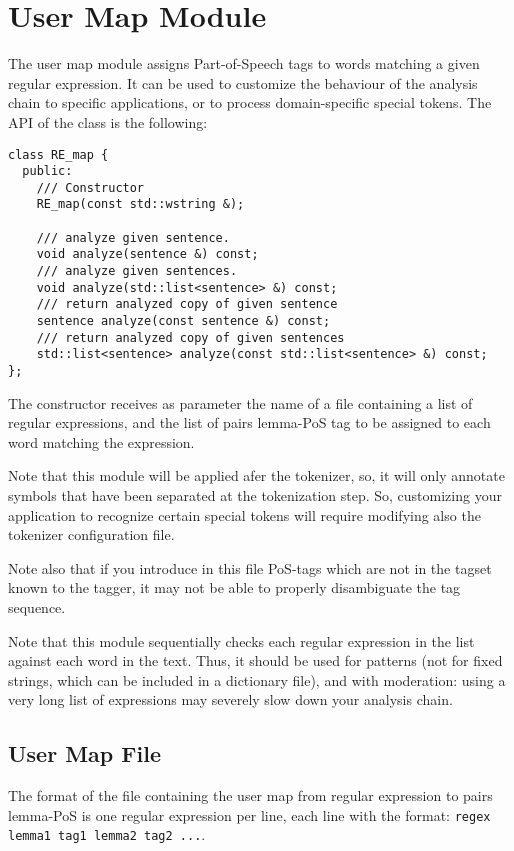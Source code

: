 \documentclass[a4paper]{book}
\begin{document}
\section{User Map Module}
\label{file-usermap}

 The user map module assigns Part-of-Speech tags to words matching a
 given regular expression. It can be used to customize the behaviour
 of the analysis chain to specific applications, or to process
 domain-specific special tokens. The API of the class is the
 following:
\begin{verbatim}  
class RE_map {
  public:
    /// Constructor
    RE_map(const std::wstring &); 
 
    /// analyze given sentence.
    void analyze(sentence &) const;
    /// analyze given sentences.
    void analyze(std::list<sentence> &) const;
    /// return analyzed copy of given sentence
    sentence analyze(const sentence &) const;
    /// return analyzed copy of given sentences
    std::list<sentence> analyze(const std::list<sentence> &) const;
};
\end{verbatim}

 The constructor receives as parameter the name of a file containing a
 list of regular expressions, and the list of pairs lemma-PoS tag to be
 assigned to each word matching the expression.

 Note that this module will be applied afer the tokenizer, so, it will
 only annotate symbols that have been separated at the tokenization
 step. So, customizing your application to recognize certain special
 tokens will require modifying also the tokenizer configuration file.

 Note also that if you introduce in this file PoS-tags which are not
 in the tagset known to the tagger, it may not be able to properly
 disambiguate the tag sequence.

 Note that this module sequentially checks each regular expression in
 the list against each word in the text. Thus, it should be used for
 patterns (not for fixed strings, which can be included in a
 dictionary file), and with moderation: using a very long list of
 expressions may severely slow down your analysis chain.

\subsection{User Map File}

 The format of the file containing the user map from regular
 expression to pairs lemma-PoS is one regular expression per line,
 each line with the format: {\tt regex lemma1 tag1 lemma2 tag2 ...}.
 
\end{document}
